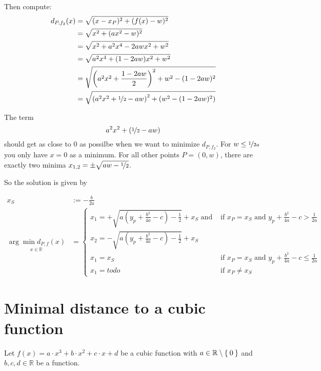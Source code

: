 \documentclass[a4paper]{scrartcl}
\theoremstyle{break}
\def\mdr{\ensuremath{\mathbb{R}}}
\theoremstyle{nonumberplain}
\def\mdr{\ensuremath{\mathbb{R}}}
\begin{document}
Then compute:
\begin{align}
  d_{P,{f_2}}(x)  &= \sqrt{(x-x_{P})^2 + (f(x)-w)^2}\\
    &= \sqrt{x^2 + (ax^2-w)^2}\\
    &= \sqrt{x^2 + a^2 x^4-2aw x^2+w^2}\\
    &= \sqrt{a^2 x^4 + (1-2aw) x^2 + w^2}\\
    &= \sqrt{\left (a^2 x^2 + \frac{1-2 a w}{2} \right )^2 + w^2 - (1-2 a w)^2}\\
    &= \sqrt{\left (a^2 x^2 + \nicefrac{1}{2}-a w \right )^2 + (w^2 - (1-2 a w)^2)}\\
\end{align}

The term 
\[a^2 x^2 + (\nicefrac{1}{2}-a w)\]
should get as close to $0$ as possilbe when we want to minimize 
$d_{P,{f_2}}$. For $w \leq \nicefrac{1}{2a}$ you only have $x = 0$ as a minimum.
For all other points $P = (0, w)$, there are exactly two minima $x_{1,2} = \pm \sqrt{aw - \nicefrac{1}{2}}$.

So the solution is given by

\begin{align*}
x_S &:= - \frac{b}{2a}\\
\underset{x\in\mdr}{\arg \min d_{P,f}(x)} &= \begin{cases}
     x_1 = +\sqrt{a (y_p + \frac{b^2}{4a} - c) - \frac{1}{2}} + x_S \text{ and }   &\text{if } x_P = x_S \text{ and } y_p + \frac{b^2}{4a} - c >  \frac{1}{2a} \\
     x_2 = -\sqrt{a (y_p + \frac{b^2}{4a} - c) - \frac{1}{2}} + x_S\\
     x_1 = x_S   &\text{if } x_P = x_S \text{ and } y_p + \frac{b^2}{4a} - c \leq  \frac{1}{2a} \\
     x_1 = todo   &\text{if } x_P \neq x_S
    \end{cases}
\end{align*}

\clearpage
\section{Minimal distance to a cubic function}
Let $f(x) = a \cdot x^3 + b \cdot x^2 + c \cdot x + d$ be a cubic function
with $a \in \mdr \setminus \Set{0}$ and 
$b, c, d \in \mdr$ be a function.
\end{document}
